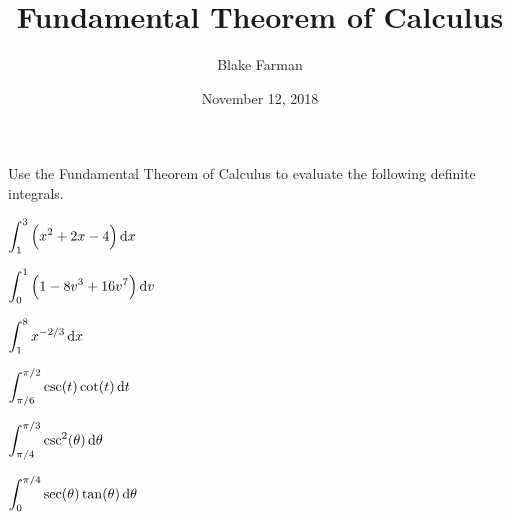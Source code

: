 \documentclass[10pt]{amsart}
\title{Fundamental Theorem of Calculus}
\date{November 12, 2018}
\author{Blake Farman}
\begin{document}
\maketitle

\makenameslot

Use the Fundamental Theorem of Calculus to evaluate the following definite integrals.
\begin{multicols}{2}
  \begin{thm}
    \(\displaystyle{\int_1^3 \left(x^2 + 2x - 4\right)\dif x}\)
  \end{thm}

  \begin{thm}
    \(\displaystyle{\int_0^1 \left(1 - 8v^3 + 16v^7\right) \dif v}\)
  \end{thm}
\end{multicols}

\vspace{2in}

\begin{multicols}{2}
  \begin{thm}
    \(\displaystyle{\int_1^8 x^{-2/3}\dif x}\)
  \end{thm}
  
  \begin{thm}
    \(\displaystyle{\int_{\pi/6}^{\pi/2} \csc(t)\cot(t)\dif t}\)
  \end{thm}
\end{multicols}

\vspace{2in}

\newpage
\begin{multicols}{2}
  \begin{thm}
    \(\displaystyle{\int_{\pi/4}^{\pi/3} \csc^2(\theta)\dif\theta}\)
  \end{thm}

  \begin{thm}
    \(\displaystyle{\int_0^{\pi/4} \sec(\theta)\tan(\theta)\dif\theta}\)
  \end{thm}
\end{multicols}
\end{document}

